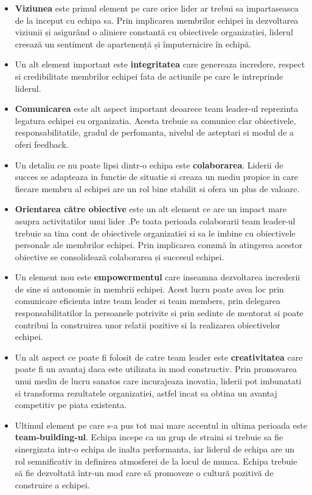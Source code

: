 \documentclass[a4paper, 12pt]{article}
\begin{document}
	\begin{itemize}
	\item\textbf{Viziunea} este primul element pe care orice lider ar trebui sa impartaseasca de la inceput cu echipa sa. Prin implicarea membrilor echipei în dezvoltarea viziunii și asigurând o aliniere constantă cu obiectivele organizației, liderul creează un sentiment de apartenență și împuternicire în echipă.
	\item Un alt element important este \textbf{integritatea} care genereaza incredere, respect si credibilitate membrilor echipei fata de actiunile pe care le intreprinde liderul.
	\item \textbf{Comunicarea} este alt aspect important deoarece team leader-ul reprezinta legatura echipei cu organizatia. Acesta trebuie sa comunice clar obiectivele, responsabilitatile, gradul de perfomanta, nivelul de asteptari si modul de a oferi feedback.
	\item Un detaliu ce nu poate lipsi dintr-o echipa este \textbf{colaborarea}. Liderii de succes se adapteaza in functie de situatie si creaza un mediu propice in care fiecare membru al echipei are un rol bine stabilit si ofera un plus de valoare.
	\item \textbf{Orientarea către obiective} este un alt element ce are un impact mare asupra activitatilor unui lider .Pe toata perioada colaborarii team leader-ul trebuie sa tina cont de obiectivele organizatiei si sa le imbine cu obiectivele personale ale membrilor echipei. Prin implicarea comună în atingerea acestor obiective se consolidează colaborarea și succesul echipei.
	\item Un element nou este \textbf{empowermentul} care inseamna dezvoltarea increderii de sine si autonomie in membrii echipei. Acest lucru poate avea loc prin comunicare eficienta intre team leader si team members, prin delegarea responsabilitatilor la persoanele potrivite si prin sedinte de mentorat si poate contribui la construirea unor relatii pozitive si la realizarea obiectivelor echipei.
	\item Un alt aspect ce poate fi folosit de catre team leader este \textbf{creativitatea} care poate fi un avantaj daca este utilizata in mod constructiv. Prin promovarea unui mediu de lucru sanatos care incurajeaza inovatia, liderii pot imbunatati si transforma rezultatele organizatiei, astfel incat sa obtina un avantaj competitiv pe piata existenta.
	\item Ultimul element pe care s-a pus tot mai mare accentul in ultima perioada este\textbf{ team-building-ul}. Echipa incepe ca un grup de straini si trebuie sa fie sinergizata intr-o echipa de inalta performanta, iar liderul de echipa are un rol semnificativ in definirea atmosferei de la locul de munca. Echipa trebuie să fie dezvoltată într-un mod care să promoveze o cultură pozitivă de construire a echipei.
	\end{itemize}
\end{document}
